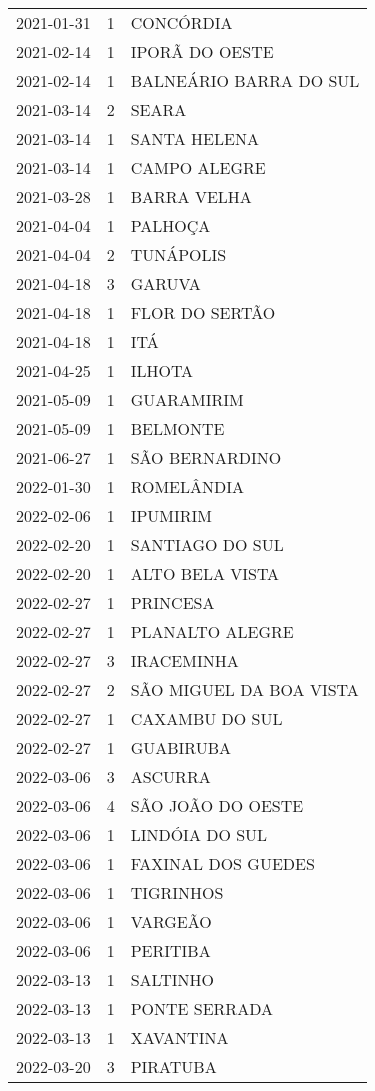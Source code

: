\documentclass[
	12pt,				%
	openright,			%
	oneside,			%
	a4paper,			%
	english,			%
	french,				%
	spanish,			%
	brazil				%
	dvipsnames, table]{abntex2}
\begin{document}
\begin{longtable}[htbp]{ccl}
2021-01-31 & 1 & CONCÓRDIA \\
2021-02-14 & 1 & IPORÃ DO OESTE \\
2021-02-14 & 1 & BALNEÁRIO BARRA DO SUL \\
2021-03-14 & 2 & SEARA \\
2021-03-14 & 1 & SANTA HELENA \\
2021-03-14 & 1 & CAMPO ALEGRE \\
2021-03-28 & 1 & BARRA VELHA \\
2021-04-04 & 1 & PALHOÇA \\
2021-04-04 & 2 & TUNÁPOLIS \\
2021-04-18 & 3 & GARUVA \\
2021-04-18 & 1 & FLOR DO SERTÃO \\
2021-04-18 & 1 & ITÁ \\
2021-04-25 & 1 & ILHOTA \\
2021-05-09 & 1 & GUARAMIRIM \\
2021-05-09 & 1 & BELMONTE \\
2021-06-27 & 1 & SÃO BERNARDINO \\
2022-01-30 & 1 & ROMELÂNDIA \\
2022-02-06 & 1 & IPUMIRIM \\
2022-02-20 & 1 & SANTIAGO DO SUL \\
2022-02-20 & 1 & ALTO BELA VISTA \\
2022-02-27 & 1 & PRINCESA \\
2022-02-27 & 1 & PLANALTO ALEGRE \\
2022-02-27 & 3 & IRACEMINHA \\
2022-02-27 & 2 & SÃO MIGUEL DA BOA VISTA \\
2022-02-27 & 1 & CAXAMBU DO SUL \\
2022-02-27 & 1 & GUABIRUBA \\
2022-03-06 & 3 & ASCURRA \\
2022-03-06 & 4 & SÃO JOÃO DO OESTE \\
2022-03-06 & 1 & LINDÓIA DO SUL \\
2022-03-06 & 1 & FAXINAL DOS GUEDES \\
2022-03-06 & 1 & TIGRINHOS \\
2022-03-06 & 1 & VARGEÃO \\
2022-03-06 & 1 & PERITIBA \\
2022-03-13 & 1 & SALTINHO \\
2022-03-13 & 1 & PONTE SERRADA \\
2022-03-13 & 1 & XAVANTINA \\
2022-03-20 & 3 & PIRATUBA \\

\end{longtable}
\end{document}
